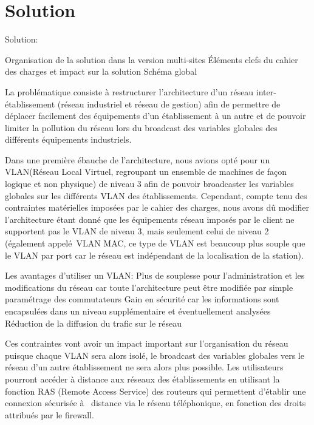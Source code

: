 \section{Solution}

Solution:

Organisation de la solution dans la version multi-sites
Éléments clefs du cahier des charges et impact sur la solution
Schéma global

La problématique consiste à restructurer l'architecture d'un réseau
inter-établissement (réseau industriel et réseau de gestion) afin de
permettre de déplacer facilement des équipements d'un établissement
à un autre et de pouvoir limiter la pollution du réseau lors du broadcast
des variables globales des différents équipements industriels.

Dans une première ébauche de l'architecture, nous avions opté pour un
VLAN(Réseau Local Virtuel, regroupant un ensemble de machines de façon
logique et non physique) de niveau 3 afin de pouvoir broadcaster les variables
globales sur les différents VLAN des établissements. Cependant, compte tenu des
contraintes matérielles imposées par le cahier des charges, nous avons dû
modifier l'architecture étant donné que les équipements réseau imposés par le
client ne supportent pas le VLAN de niveau 3, mais seulement celui de niveau 2
(également appelé VLAN MAC, ce type de VLAN est beaucoup plus souple  que le
VLAN par port car le réseau est indépendant de la localisation de la station). 


Les avantages d'utiliser un VLAN:
Plus de souplesse pour l'administration et les modifications du réseau car toute
l'architecture peut être modifiée par simple paramétrage des commutateurs
Gain en sécurité car les informations sont encapsulées dans un niveau
supplémentaire et éventuellement analysées
Réduction de la diffusion du trafic sur le réseau

Ces contraintes vont avoir un impact important sur l'organisation du réseau
puisque chaque VLAN sera alors isolé, le broadcast des variables globales vers
le réseau d'un autre établissement ne sera alors plus possible. 
Les utilisateurs pourront accéder à distance aux réseaux des établissements en
utilisant la fonction RAS (Remote Access Service) des routeurs qui permettent
d'établir une connexion sécurisée à  distance via le réseau téléphonique, en
fonction des droits attribués par le firewall. 

